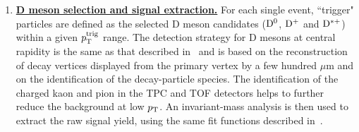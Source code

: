 \begin{enumerate}

\item
\underline {\bf D meson selection and signal extraction.}  For each single event, ``trigger" particles
are defined as the selected  D meson candidates (${\rm D^0}$, ${\rm D^+}$ and ${\rm D^{*+}}$)
within a given $p_{\rm T}^{\rm trig}$ range. The detection strategy for D mesons at central rapidity is
the same as that described in~\cite{ALICEDmespp7Tev} and is based on the reconstruction of decay
vertices displayed from the primary vertex by a few hundred $\mu$m and on the identification of the decay-particle species.
The identification of the charged kaon and pion in the TPC and TOF
detectors helps to further reduce the background at low $p_{\rm T}$.  An
invariant-mass analysis is then used to extract the raw signal yield, using
the same fit functions described in~\cite{ALICEDmespp7Tev}.


\begin{figure}[!htp]
\centering


\end{figure}
\end{enumerate}
